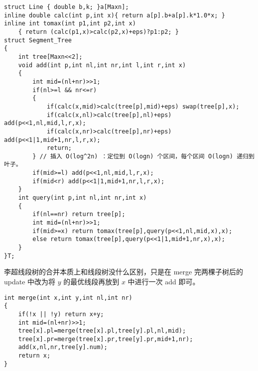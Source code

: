\begin{verbatim}
struct Line { double b,k; }a[Maxn];
inline double calc(int p,int x){ return a[p].b+a[p].k*1.0*x; }
inline int tomax(int p1,int p2,int x)
    { return (calc(p1,x)>calc(p2,x)+eps)?p1:p2; }
struct Segment_Tree
{
    int tree[Maxn<<2];
    void add(int p,int nl,int nr,int l,int r,int x)
    {
        int mid=(nl+nr)>>1;
        if(nl>=l && nr<=r)
        {
            if(calc(x,mid)>calc(tree[p],mid)+eps) swap(tree[p],x);
            if(calc(x,nl)>calc(tree[p],nl)+eps) add(p<<1,nl,mid,l,r,x);
            if(calc(x,nr)>calc(tree[p],nr)+eps) add(p<<1|1,mid+1,nr,l,r,x);
            return;
        } // 插入 O(log^2n) ：定位到 O(logn) 个区间，每个区间 O(logn) 递归到叶子。
        if(mid>=l) add(p<<1,nl,mid,l,r,x);
        if(mid<r) add(p<<1|1,mid+1,nr,l,r,x);
    }
    int query(int p,int nl,int nr,int x)
    {
        if(nl==nr) return tree[p];
        int mid=(nl+nr)>>1;
        if(mid>=x) return tomax(tree[p],query(p<<1,nl,mid,x),x);
        else return tomax(tree[p],query(p<<1|1,mid+1,nr,x),x);
    }
}T;
\end{verbatim}

李超线段树的合并本质上和线段树没什么区别，只是在 merge 完两棵子树后的 update 中改为将 $y$ 的最优线段再放到 $x$ 中进行一次 add 即可。

\begin{verbatim}
int merge(int x,int y,int nl,int nr)
{
    if(!x || !y) return x+y;
    int mid=(nl+nr)>>1;
    tree[x].pl=merge(tree[x].pl,tree[y].pl,nl,mid);
    tree[x].pr=merge(tree[x].pr,tree[y].pr,mid+1,nr);
    add(x,nl,nr,tree[y].num);
    return x;
}
\end{verbatim}